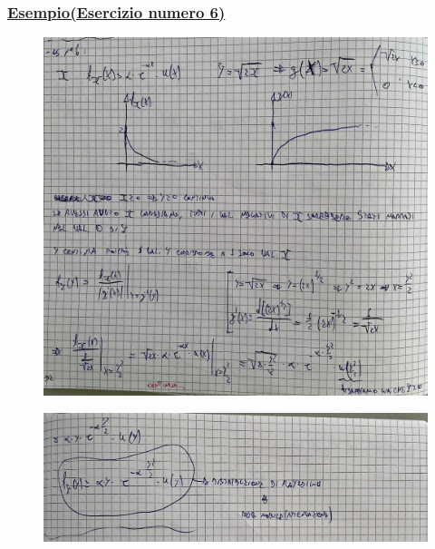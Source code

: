 \documentclass{article}
\begin{document}
\subsubsection{\underline{Esempio(Esercizio numero 6)}}
\begin{figure}[H]
\centering
\includegraphics[scale=0.10]{ese/25.jpeg}
\end{figure}
\begin{figure}[H]
\centering
\includegraphics[scale=0.10]{ese/25a.jpeg}
\end{figure}
\end{document}
